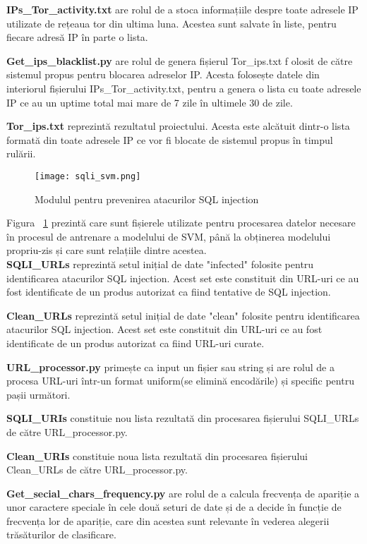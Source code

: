\textbf{IPs\_Tor\_activity.txt}  are rolul de a stoca informațiile despre toate adresele IP utilizate de rețeaua tor din ultima luna. Acestea sunt salvate în liste, pentru fiecare adresă IP în parte o lista.  

\textbf{Get\_ips\_blacklist.py} are rolul de genera  fișierul  Tor\_ips.txt f olosit de către sistemul propus pentru blocarea adreselor IP. Acesta folosește datele din interiorul fișierului  IPs\_Tor\_activity.txt,  pentru a genera o lista cu toate adresele IP ce au un uptime total mai mare de 7 zile în ultimele 30 de zile. 

\textbf{Tor\_ips.txt}  reprezintă rezultatul proiectului. Acesta este alcătuit dintr-o lista formată din toate adresele IP ce vor fi blocate de sistemul propus în timpul rulării. 

\newpage

\begin{figure}[h]
	\centering
	\texttt{[image: sqli\_svm.png]}
	\caption{Modulul pentru prevenirea atacurilor SQL injection}
	\label{fig:sqli_svm}
\end{figure}
Figura ~\ref{fig:sqli_svm}  prezintă care sunt fișierele utilizate pentru procesarea datelor necesare în procesul de antrenare a modelului de SVM, până la obținerea modelului propriu-zis și care sunt relațiile dintre acestea. \\

\textbf{SQLI\_URLs}  reprezintă setul inițial de date "infected" folosite pentru identificarea atacurilor SQL injection. Acest set este constituit din URL-uri ce au fost identificate de un produs autorizat ca fiind tentative de SQL injection. 

\textbf{Clean\_URLs}  reprezintă setul inițial de date "clean" folosite pentru identificarea atacurilor SQL injection. Acest set este constituit din URL-uri ce au fost identificate de un produs autorizat ca fiind URL-uri curate. 

\textbf{URL\_processor.py}  primește ca input un fișier sau string și are rolul de a procesa URL-uri într-un format uniform(se elimină encodările) și specific pentru pașii următori. 

\textbf{SQLI\_URIs}  constituie nou lista rezultată din procesarea fișierului SQLI\_URLs de către URL\_processor.py.

\textbf{Clean\_URIs}  constituie noua lista rezultată din procesarea fișierului Clean\_URLs de către URL\_processor.py.

\textbf{Get\_secial\_chars\_frequency.py} are rolul de  a calcula frecvența de apariție a unor caractere speciale în cele două seturi de date și de a decide în funcție de frecvența lor de apariție, care din acestea sunt relevante în vederea alegerii trăsăturilor de clasificare. 


